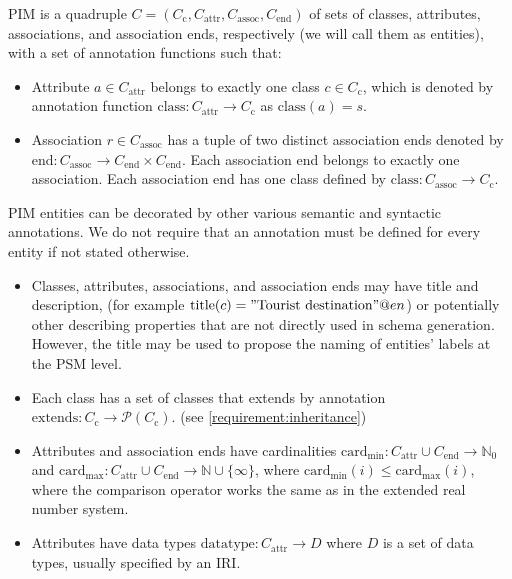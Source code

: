 \begin{definition}[PIM] PIM is a quadruple $C=(C_\textrm{c}, C_\textrm{attr}, C_\textrm{assoc}, C_\textrm{end})$ of sets of classes, attributes, associations, and association ends, respectively (we will call them as entities), with a set of annotation functions such that:
    \begin{itemize}
        \item Attribute $a \in C_\textrm{attr}$ belongs to exactly one class $c \in C_\textrm{c}$, which is denoted by annotation function $\textrm{class}: C_\textrm{attr} \rightarrow C_\textrm{c}$ as $\textrm{class}(a)=s$.
        \item Association $r \in C_\textrm{assoc}$ has a tuple of two distinct association ends denoted by $\textrm{end}: C_\textrm{assoc} \rightarrow C_\textrm{end}\times C_\textrm{end}$. Each association end belongs to exactly one association. Each association end has one class defined by $\textrm{class}: C_\textrm{assoc} \rightarrow C_\textrm{c}$.
    \end{itemize}

    PIM entities can be decorated by other various semantic and syntactic annotations. We do not require that an annotation must be defined for every entity if not stated otherwise.

    \begin{itemize}
        \item Classes, attributes, associations, and association ends may have title and description, (for example $\textrm{title}(c)="\textrm{Tourist destination}"@en$) or potentially other describing properties that are not directly used in schema generation. However, the title may be used to propose the naming of entities' labels at the PSM level.
        \item Each class has a set of classes that extends by annotation $\textrm{extends}: C_\textrm{c} \rightarrow \mathcal{P}(C_\textrm{c})$. (see \autoref{requirement:inheritance})
        \item Attributes and association ends have cardinalities $\textrm{card}_{\textrm{min}}: C_\textrm{attr} \cup C_\textrm{end} \rightarrow \mathds{N}_0$ and $\textrm{card}_{\textrm{max}}: C_\textrm{attr} \cup C_\textrm{end} \rightarrow \mathds{N} \cup \{\infty\}$, where $\textrm{card}_{\textrm{min}}(i) \leq \textrm{card}_{\textrm{max}}(i)$, where the comparison operator works the same as in the extended real number system.
        \item Attributes have data types $\textrm{datatype}: C_\textrm{attr} \rightarrow D$ where $D$ is a set of data types, usually specified by an IRI.
    \end{itemize}
\end{definition}


